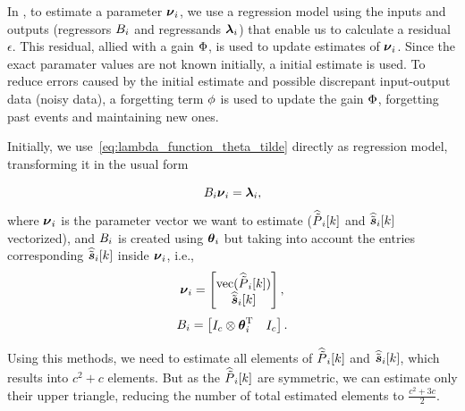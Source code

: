 \documentclass[../main.tex]{subfiles}
\begin{document}
In \RLS{}, to estimate a parameter ${\boldsymbol{\nu}_{i}}$, we use a regression model using the inputs and outputs (regressors ${B_i}$ and regressands ${\boldsymbol{\lambda}_i}$) that enable us to calculate a residual $\epsilon$.
This residual, allied with a gain ${\Phi}$, is used to update estimates of ${\boldsymbol{\nu}_{i}}$.
Since the exact paramater values are not known initially, a initial estimate is used.
To reduce errors caused by the initial estimate and possible discrepant input-output data (noisy data), a forgetting term ${\phi}$ is used to update the gain ${\Phi}$, forgetting past events and maintaining new ones.

Initially, we use~\eqref{eq:lambda_function_theta_tilde} directly as regression model, transforming it in the usual form

\begin{equation}
  {B_i}{\boldsymbol{\nu}_{i}}={\boldsymbol{\lambda}_i},
\end{equation}
where ${\boldsymbol{\nu}_{i}}$ is the parameter vector we want to estimate ($\widehat{\tilde{P}}_{i}[k]$ and $\widehat{\tilde{\boldsymbol{s}}}_{i}[k]$ vectorized), and ${B_i}$ is created using $\boldsymbol{\theta}_i$ but taking into account the entries corresponding $\widehat{\tilde{\boldsymbol{s}}}_{i}[k]$ inside ${\boldsymbol{\nu}_{i}}$, i.e.,
\begin{equation}
  {\boldsymbol{\nu}_{i}}=\left[
    \begin{matrix}
      \mathrm{vec} (\widehat{\tilde{P}}_{i}[k])\\
      \widehat{\tilde{\boldsymbol{s}}}_{i}[k]\\
    \end{matrix}
  \right],
\end{equation}
\begin{equation}
  {B_i}=\left[
    \begin{matrix}
      I_{c}\otimes\boldsymbol{\theta}_i^{\mathrm{T}}&I_{c}\\
    \end{matrix}
  \right].
\end{equation}

Using this methods, we need to estimate all elements of $\widehat{\tilde{P}}_{i}[k]$ and $\widehat{\tilde{\boldsymbol{s}}}_{i}[k]$, which results into ${c^{2}+c}$ elements. But as the $\widehat{\tilde{P}}_{i}[k]$ are symmetric, we can estimate only their upper triangle, reducing the number of total estimated elements to ${\frac{c^{2}+3c}{2}}$.
\end{document}

